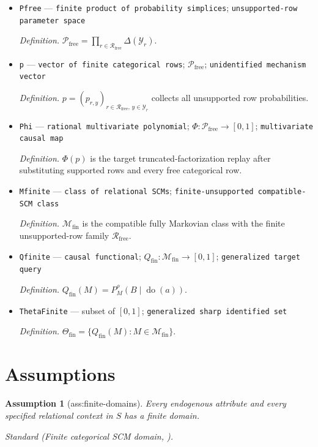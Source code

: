 \documentclass{article}
\newtheorem{assumption}{Assumption}
\begin{document}
\begin{itemize}
  \item \texttt{Pfree} --- \texttt{finite product of probability simplices}; \texttt{unsupported-\allowbreak{}row parameter space}
  \par\smallskip\noindent\emph{Definition.} \(\mathcal P_{\mathrm{free}}=\prod_{r\in\mathcal R_{\mathrm{free}}}\Delta(\mathcal Y_r)\).
  \item \texttt{p} --- \texttt{vector of finite categorical rows}; \(\mathcal P_{\mathrm{free}}\); \texttt{unidentified mechanism vector}
  \par\smallskip\noindent\emph{Definition.} \(p=(p_{r,y})_{r\in\mathcal R_{\mathrm{free}},\,y\in\mathcal Y_r}\) collects all unsupported row probabilities.
  \item \texttt{Phi} --- \texttt{rational multivariate polynomial}; \(\Phi:\mathcal P_{\mathrm{free}}\to[0,1]\); \texttt{multivariate causal map}
  \par\smallskip\noindent\emph{Definition.} \(\Phi(p)\) is the target truncated-factorization replay after substituting supported rows and every free categorical row.
  \item \texttt{Mfinite} --- \texttt{class of relational SCMs}; \texttt{finite-\allowbreak{}unsupported compatible-\allowbreak{}SCM class}
  \par\smallskip\noindent\emph{Definition.} \(\mathcal M_{\mathrm{fin}}\) is the compatible fully Markovian class with the finite unsupported-row family \(\mathcal R_{\mathrm{free}}\).
  \item \texttt{Qfinite} --- \texttt{causal functional}; \(Q_{\mathrm{fin}}:\mathcal M_{\mathrm{fin}}\to[0,1]\); \texttt{generalized target query}
  \par\smallskip\noindent\emph{Definition.} \(Q_{\mathrm{fin}}(M)=P_M^{\rho}(B\mid\operatorname{do}(a))\).
  \item \texttt{ThetaFinite} --- subset of \([0,1]\); \texttt{generalized sharp identified set}
  \par\smallskip\noindent\emph{Definition.} \(\Theta_{\mathrm{fin}}=\{Q_{\mathrm{fin}}(M):M\in\mathcal M_{\mathrm{fin}}\}\).
\end{itemize}

\section{Assumptions}

\begin{assumption}[ass:finite-domains]\label{ass:finite-domains}
Every endogenous attribute and every specified relational context in \(S\) has a finite domain.
\par\smallskip\noindent\emph{Standard} (Finite categorical SCM domain, \cite{ZhangTianBareinboim2022PartialCF}).
\end{assumption}
\end{document}
